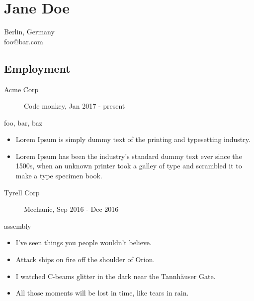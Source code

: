 \documentclass[10pt]{article}
\begin{document}
  
    \section{Jane Doe}
    Berlin, Germany\\
    foo@bar.com



\begin{paracol}{2}
\begin{leftcolumn}
\section{Employment}

\begin{description}
    \item [Acme Corp] Code monkey, Jan 2017 - present
    \item [\footnotesize{
     foo,  bar,  baz 
    }]
\end{description}
\begin{itemize}
    
    \item Lorem Ipsum is simply dummy text of the printing and typesetting industry.
    
    \item Lorem Ipsum has been the industry's standard dummy text ever since the 1500s, when an unknown printer took a galley of type and scrambled it to make a type specimen book.
    
\end{itemize}

\begin{description}
    \item [Tyrell Corp] Mechanic, Sep 2016 - Dec 2016
    \item [\footnotesize{
     assembly 
    }]
\end{description}
\begin{itemize}
    
    \item I've seen things you people wouldn't believe.
    
    \item Attack ships on fire off the shoulder of Orion.
    
    \item I watched C-beams glitter in the dark near the Tannhäuser Gate.
    
    \item All those moments will be lost in time, like tears in rain.
    

\end{itemize}
\end{leftcolumn}
\end{paracol}
\end{document}
